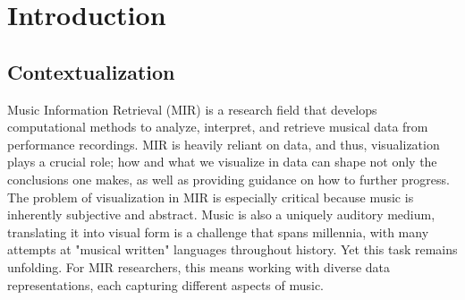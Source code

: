 \chapter{Introduction} \label{chap:intro}

\section*{}




\section{Contextualization} \label{sec:context}
Music Information Retrieval (MIR) is a research field that develops computational methods to analyze, interpret, and retrieve musical data from performance recordings. MIR is heavily reliant on data, and thus, visualization plays a crucial role; how and what we visualize in data can shape not only the conclusions one makes, as well as providing guidance on how to further progress. The problem of visualization in MIR is especially critical because music is inherently subjective and abstract. Music is also a uniquely auditory medium, translating it into visual form is a challenge that spans millennia, with many attempts at "musical written" languages throughout history. Yet this task remains unfolding. For MIR researchers, this means working with diverse data representations, each capturing different aspects of music.

